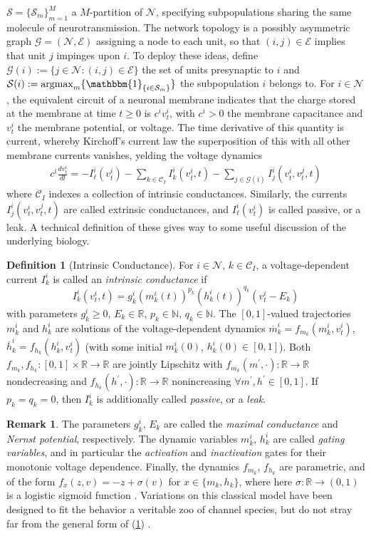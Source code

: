 \documentclass[12pt, oneside]{report}
\newcommand{\mbb}[1]{\mathbb{#1}}
\newcommand{\1}[1]{\mathbbm{1}_{\{#1\}}}
\newcommand{\mc}[1]{\mathcal{#1}}
\newcommand*{\td}[1]{\overset{\bm .}{#1}}
\DeclareMathOperator{\argmax}{argmax} \DeclareMathOperator{\erf}{erf}
\theoremstyle{definition}
\newtheorem{definition}[theorem]{Definition}
\newtheorem{remark}[theorem]{Remark}
\begin{document}
$\mc{S}=\{\mc{S}_m\}_{m=1}^M$ a $M$-partition of $\mc{N}$, specifying
subpopulations sharing the same molecule of neurotransmission. The network
topology is a possibly asymmetric graph $\mc{G}=(\mc{N},\mc{E})$ assigning a
node to each unit, so that $(i,j)\in\mc{E}$ implies that unit $j$ impinges upon
$i$. To deploy these ideas, define $\mc{G}(i):=\{j\in\mc{N}:(i,j)\in\mc{E}\}$
the set of units presynaptic to $i$ and
$\mc{S}(i):=\argmax_m\{\1{i\in\mc{S}_m}\}$ the subpopulation $i$ belongs to. For
$i\in\mc{N}$, the equivalent circuit of a neuronal membrane indicates that the
charge stored at the membrane at time $t\geq 0$ is $c^iv^i_t$, with $c^i>0$ the
membrane capacitance and $v^i_t$ the membrane potential, or voltage. The time
derivative of this quantity is current, whereby Kirchoff's current law the
superposition of this with all other membrane currents vanishes, yelding the
voltage dynamics
\begin{align}
    c^i\frac{dv^i_t}{dt}=-I^i_\ell(v^i_t)-\sum_{k\in\mc{C}_I}I^i_k(v^i_t,t)-\sum_{j\in\mc{G}(i)}I^i_j(v^i_t,v^j_t,t)\label{eq17}
\end{align}
where $\mc{C}_I$ indexes a collection of intrinsic conductances. Similarly, the
currents $I^i_j(v^i_t,v^j_t,t)$ are called extrinsic conductances, and
$I^i_\ell(v^i_t)$ is called passive, or a leak. A technical definition of these
gives way to some useful discussion of the underlying biology.
\begin{definition}[Intrinsic Conductance]\label{def11} For $i\in\mc{N}$,
    $k\in\mc{C}_I$, a voltage-dependent current $I^i_k$ is called an {\it
    intrinsic conductance} if
    \[I^i_k(v^i_t,t)=g^i_k(m^i_k(t))^{p_k}(h^i_k(t))^{q_k}(v^i_t-E_k)\] with
    parameters $g^i_k\geq0$, $E_k\in\mbb{R}$, $p_k\in\mbb{N}$, $q_k\in\mbb{N}$.
    The $[0,1]$-valued trajectories $m^i_k$ and $h^i_k$ are solutions of the
    voltage-dependent dynamics $\td{m}^i_k=f_{m_k}(m^i_k,v^i_t)$,
    $\td{h}^i_k=f_{h_k}(h^i_k,v^i_t)$ (with some initial $m^i_k(0)$,
    $h^i_k(0)\in[0,1]$). Both
    $f_{m_k},f_{h_k}:[0,1]\times\mbb{R}\rightarrow\mbb{R}$ are jointly Lipschitz
    with $f_{m_k}(m^\prime,\cdot):\mbb{R}\rightarrow\mbb{R}$ nondecreasing and
    $f_{h_k}(h^\prime,\cdot):\mbb{R}\rightarrow\mbb{R}$ nonincreasing $\forall
    m^\prime,h^\prime\in[0,1]$. If $p_k=q_k=0$, then $I^i_k$ is additionally
    called {\it passive}, or a {\it leak}.
\end{definition}
\begin{remark}
    The parameters $g^i_k$, $E_k$ are called the {\it maximal conductance} and
    {\it Nernst potential}, respectively. The dynamic variables $m^i_k$,
    $h^i_k$ are called {\it gating variables}, and in particular the {\it
    activation} and {\it inactivation} gates for their monotonic voltage
    dependence. Finally, the dynamics $f_{m_k}$, $f_{h_k}$ are parametric, and
    of the form $f_{x}(z,v)=-z+\sigma(v)$ for $x\in\{m_k,h_k\}$, where here
    $\sigma:\mbb{R}\rightarrow (0,1)$ is a logistic sigmoid function \cite{Hodgkin_Huxley_1952}.
    Variations on this classical model have been designed to fit
    the behavior a veritable zoo of channel species, but do not stray far from
    the general form of (\ref{def11}) \cite[ch.5]{Ermentrout_Terman_2010}.
\end{remark}
\end{document}

